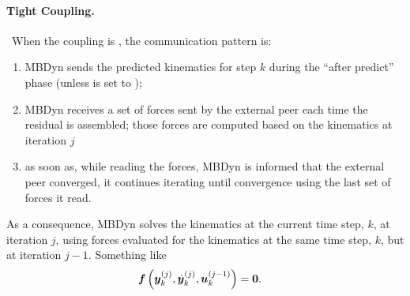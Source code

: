 \paragraph{Tight Coupling.} \
When the coupling is , the communication pattern is:
\begin{enumerate}
\item MBDyn sends the predicted kinematics for step $k$
	during the ``after predict'' phase
	(unless  is set to );

\item MBDyn receives a set of forces sent by the external peer
	each time the residual is assembled; those forces are computed
	based on the kinematics at iteration $j$

\item as soon as, while reading the forces, MBDyn is informed that
	the external peer converged, it continues iterating until
	convergence using the last set of forces it read.

\end{enumerate}
As a consequence, MBDyn solves the kinematics at the current time step, $k$,
at iteration $j$,
using forces evaluated for the kinematics at the same time step, $k$,
but at iteration $j-1$.
Something like
\begin{align}
	\boldsymbol{f}\left( \boldsymbol{y}_k^{(j)}, \dot{\boldsymbol{y}}_k^{(j)}, \boldsymbol{u}_k^{(j-1)} \right)
	&=
	\boldsymbol{0}
	.
\end{align}




